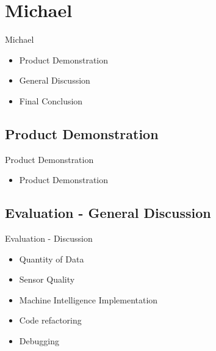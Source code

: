 \section{Michael}
\begin{frame}{Michael}
	\begin{itemize}
		\item Product Demonstration
		\item General Discussion
		\item Final Conclusion
	\end{itemize}
\end{frame}



\subsection{Product Demonstration}
\begin{frame}{Product Demonstration}
	\begin{itemize}
		\item Product Demonstration
	\end{itemize}
\end{frame}

\subsection{Evaluation - General Discussion}
\begin{frame}{Evaluation - Discussion}
	\begin{itemize}
		\item Quantity of Data
		\item Sensor Quality
		\item Machine Intelligence Implementation
		\item Code refactoring
		\item Debugging
	\end{itemize}
\end{frame}



